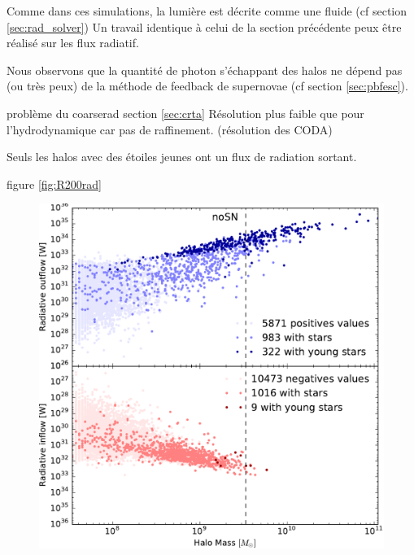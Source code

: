 Comme dans ces simulations, la lumière est décrite comme une fluide (cf section \ref{sec:rad_solver}) 
Un travail identique à celui de la section précédente peux être réalisé sur les flux radiatif.

Nous observons que la quantité de photon s'échappant des halos ne dépend pas (ou très peux) de la méthode de feedback de supernovae (cf section \ref{sec:pbfesc}).

problème du coarserad section \ref{sec:crta}
Résolution plus faible que pour l'hydrodynamique car pas de raffinement.
(résolution des CODA)

Seuls les halos avec des étoiles jeunes ont un flux de radiation sortant.

figure \ref{fig:R200rad}

\begin{figure}
	\centering
	\includegraphics[height=.30\textheight]{img/03/flux_rad_noSN.pdf} 

\end{figure}
